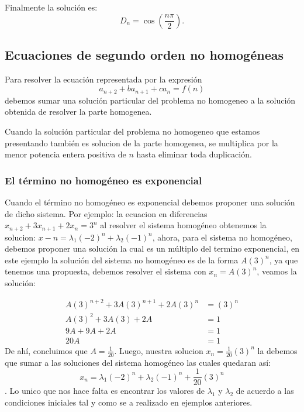\documentclass{article}
\begin{document}
Finalmente la solución es:
\begin{equation}
  \label{solucion determinante}
D_{n}=\cos(\frac{n\pi}{2}).
\end{equation}


\subsection{Ecuaciones de segundo orden no homogéneas}
\label{sec:nohomogeneas}

Para resolver la ecuación representada por la expresión
$$a_{n+2}+ba_{n+1}+ca_{n}=f(n)$$ debemos sumar una solución particular
del problema no homogeneo a la solución obtenida de resolver la parte
homogenea.

Cuando la solución particular del problema no homogeneo que estamos
presentando también es solucion de la parte homogenea, se multiplica
por la menor potencia entera positiva de $n$ hasta eliminar toda
duplicación.

\subsubsection{El término no homogéneo es exponencial}
\label{sec:exponencial}

Cuando el término no homogéneo es exponencial debemos proponer una
solución de dicho sistema. Por ejemplo: la ecuacion en diferencias
$x_{n+2}+3x_{n+1}+2x_n=3^n$ al resolver el sistema homogéneo
obtenemos la solucion: $x-n=\lambda_1(-2)^n+\lambda_2(-1)^n$, ahora,
para el sistema no homogéneo, debemos proponer una solución la
cual es un múltiplo del termino exponencial, en este ejemplo la
solución del sistema no homogéneo es de la forma $A(3)^n$, ya que
tenemos una propuesta, debemos resolver el sistema con $x_n=A(3)^n$,
veamos la solución:

\begin{align*}
  A(3)^{n+2}+3A(3)^{n+1}+2A(3)^n&=(3)^n\\
  A(3)^2+3A(3)+2A&=1\\
  9A+9A+2A&=1\\
  20A&=1
\end{align*}
De ahí, concluimos que $A=\frac{1}{20}$.
Luego, nuestra solucion $x_n=\frac{1}{20}(3)^n$ la debemos que sumar a las soluciones del sistema homogéneo las cuales quedaran así:
$$x_n=\lambda_1(-2)^n+\lambda_2(-1)^n+\frac{1}{20}(3)^n$$.
Lo unico que nos hace falta es encontrar los valores de $\lambda_1$ y $\lambda_2$ de acuerdo a las condiciones iniciales tal y como se a realizado en ejemplos anteriores.
\end{document}
